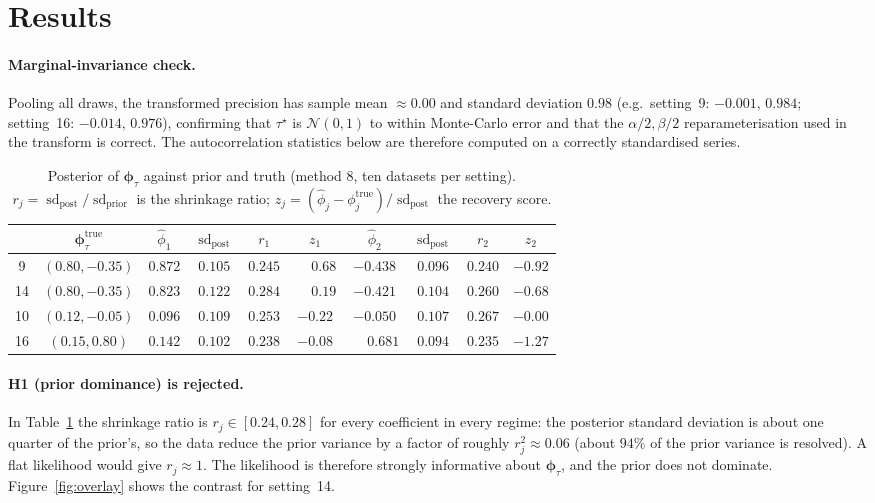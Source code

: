 \documentclass[11pt]{article}
\theoremstyle{definition}
\newcommand{\sd}{\operatorname{sd}}
\newcommand{\Norm}{\mathcal{N}}
\newcommand{\phitau}{\bm{\phi}_\tau}
\begin{document}
\section{Results}
\label{sec:results}

\paragraph{Marginal-invariance check.} Pooling all draws, the transformed
precision has sample mean $\approx 0.00$ and standard deviation $0.98$
(e.g.\ setting~9: $-0.001,\,0.984$; setting~16: $-0.014,\,0.976$), confirming that
$\tau^\star$ is $\Norm(0,1)$ to within Monte-Carlo error and that the
$\alpha/2,\beta/2$ reparameterisation used in the transform is correct. The
autocorrelation statistics below are therefore computed on a correctly
standardised series.

\begin{table}[h]
\centering \small
\renewcommand{\arraystretch}{1.2}
\begin{tabular}{c c c c c c c c c c}
\toprule
& $\phitau^{\text{true}}$
& $\hat\phi_1$ & $\sd_{\text{post}}$ & $r_1$ & $z_1$
& $\hat\phi_2$ & $\sd_{\text{post}}$ & $r_2$ & $z_2$ \\
\midrule
9  & $(0.80,-0.35)$ & $0.872$ & $0.105$ & $0.245$ & $\phantom{-}0.68$ & $-0.438$ & $0.096$ & $0.240$ & $-0.92$ \\
14 & $(0.80,-0.35)$ & $0.823$ & $0.122$ & $0.284$ & $\phantom{-}0.19$ & $-0.421$ & $0.104$ & $0.260$ & $-0.68$ \\
10 & $(0.12,-0.05)$ & $0.096$ & $0.109$ & $0.253$ & $-0.22$          & $-0.050$ & $0.107$ & $0.267$ & $-0.00$ \\
16 & $(0.15, 0.80)$ & $0.142$ & $0.102$ & $0.238$ & $-0.08$          & $\phantom{-}0.681$ & $0.094$ & $0.235$ & $-1.27$ \\
\bottomrule
\end{tabular}
\caption{Posterior of $\phitau$ against prior and truth (method 8, ten datasets
per setting). $r_j=\sd_{\text{post}}/\sd_{\text{prior}}$ is the shrinkage ratio;
$z_j=(\hat\phi_j-\phi_j^{\text{true}})/\sd_{\text{post}}$ the recovery score.}
\label{tab:posterior}
\end{table}

\paragraph{H1 (prior dominance) is rejected.} In
Table~\ref{tab:posterior} the shrinkage ratio is $r_j\in[0.24,0.28]$ for every
coefficient in every regime: the posterior standard deviation is about one quarter
of the prior's, so the data reduce the prior variance by a factor of roughly
$r_j^2\approx 0.06$ (about $94\%$ of the prior variance is resolved). A flat
likelihood would give $r_j\approx 1$. The likelihood is therefore strongly
informative about $\phitau$, and the prior does not dominate.
Figure~\ref{fig:overlay} shows the contrast for setting~14.
\end{document}
